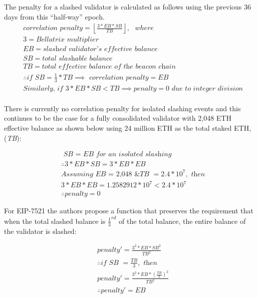 The penalty for a slashed validator is calculated as follows using the previous 36 days from this ``half-way'' epoch.
\begin{equation*}
\begin{split}
& \textit{correlation penalty} = \left\lfloor \frac{3*EB*SB}{TB} \right\rfloor, \texttt{ } where \\
& 3 = \textit{Bellatrix multiplier} \\
& EB = \textit{slashed validator's effective balance} \\
& SB = \textit{total slashable balance} \\
& TB = \textit{total effective balance of the beacon chain} \\
& \therefore \textit{if SB} = \frac{1}{3} * TB \implies \textit{ correlation penalty} = EB \\
& \textit{Similarly, if } 3*EB*SB <  TB \implies penalty = 0 \textit{ due to integer division} \\
\end{split}
\end{equation*}

There is currently no correlation penalty for isolated slashing events and this continues to be the case for a fully consolidated validator with 2,048 ETH effective balance as shown below using 24 million ETH as the total staked ETH, (\textit{TB}):

\begin{equation*}
\begin{split}
& \textit{ SB = EB for an isolated slashing} \\
& \therefore  3*EB*SB =  3*EB*EB \\
& \textit{Assuming EB = 2,048 \& TB } = 2.4 * 10^7, \textit{ then} \\
& 3*EB*EB = 1.2582912 * 10^7 < 2.4 * 10^7 \\
& \therefore penalty = 0
\end{split}
\end{equation*}

For EIP-7521 the authors propose a function that preserves the requirement that when the total slashed balance is $\frac{1}{3}^{rd}$ of the total balance, the entire balance of the validator is slashed:

\begin{equation*}
\begin{split}
& penalty' = \frac{3^2 * EB * SB^2}{TB^2} \\
& \therefore \textit{if SB } = \frac{TB}{3}, \textit{ then} \\
& penalty' =   \frac{3^2 * EB * \left(  \frac{TB}{3} \right)^2 }{TB^2} \\
& \therefore penalty' = EB
\end{split}
\end{equation*}

